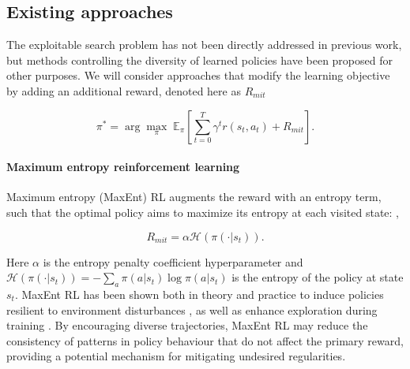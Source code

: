 \subsection{Existing approaches}

The exploitable search problem has not been directly addressed in previous work, but methods controlling the diversity of learned policies have been proposed for other purposes. We will consider approaches that modify the learning objective by adding an additional reward, denoted here as $R_{mit}$

\begin{equation}
    \pi^* = \arg \underset{\pi}{\max}\;\mathbb{E}_\pi \left[\sum^T_{t=0}\gamma^t r(s_t, a_t) + R_{mit}\right].
\end{equation}



\paragraph{Maximum entropy reinforcement learning}

Maximum entropy (MaxEnt) RL augments the reward with an entropy term, such that the optimal policy aims to maximize its entropy at each visited state: \citep{haarnoja_energybased_policies_2017},

\begin{equation}
     R_{mit} = \alpha\mathcal{H}(\pi(\cdot|s_t)).
\end{equation}

Here $\alpha$ is the entropy penalty coefficient hyperparameter and $\mathcal{H}(\pi(\cdot|s_t)) = -\sum_a\pi(a|s_t)\log\pi(a|s_t)$ is the
entropy of the policy at state $s_t$. MaxEnt RL has been shown both in theory and practice to induce policies resilient to environment disturbances \cite{eysenbach_diversity_2018}, as well as enhance exploration during training \citep{cui_entropy_2025}. By encouraging diverse trajectories, MaxEnt RL may reduce the consistency of patterns in policy behaviour that do not affect the primary reward, providing a potential mechanism for mitigating undesired regularities.

